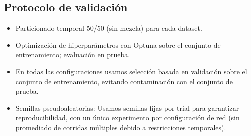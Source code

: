 \subsection{Protocolo de validación}
\begin{itemize}
    \item Particionado temporal 50/50 (sin mezcla) para cada dataset.
    \item Optimización de hiperparámetros con Optuna sobre el conjunto de entrenamiento; evaluación en prueba. 
    \item En todas las configuraciones usamos selección basada en validación sobre el conjunto de entrenamiento, evitando contaminación con el conjunto de prueba.
    \item Semillas pseudoaleatorias: Usamos semillas fijas por trial para garantizar reproducibilidad, con un único experimento por configuración de red (sin promediado de corridas múltiples debido a restricciones temporales).
\end{itemize}
